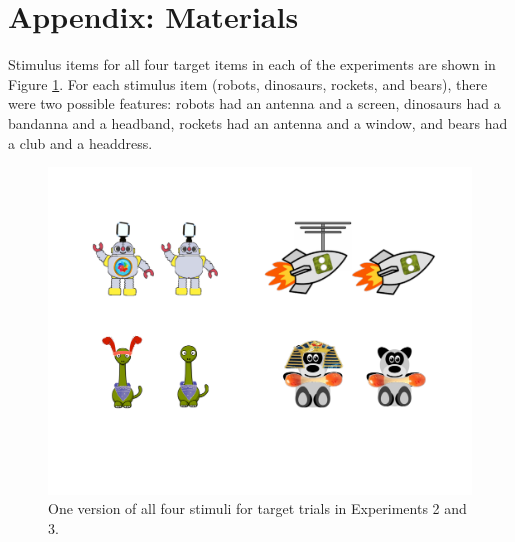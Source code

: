\documentclass[man,noapacite]{apa2}
\begin{document}
\newpage




\newpage

\theappendix 

\section{Appendix: Materials}

Stimulus items for all four target items in each of the experiments are shown in Figure \ref{fig:all_stims}. For each stimulus item (robots, dinosaurs, rockets, and bears), there were two possible features: robots had an antenna and a screen, dinosaurs had a bandanna and a headband, rockets had an antenna and a window, and bears had a club and a headdress.

\begin{figure}[tr]
\begin{center}
\includegraphics[width=6.5in]{figures/info_stims.pdf}
\caption{\label{fig:all_stims} One version of all four stimuli for target trials in Experiments 2 and 3.}
\end{center}
\end{figure}
\end{document}
